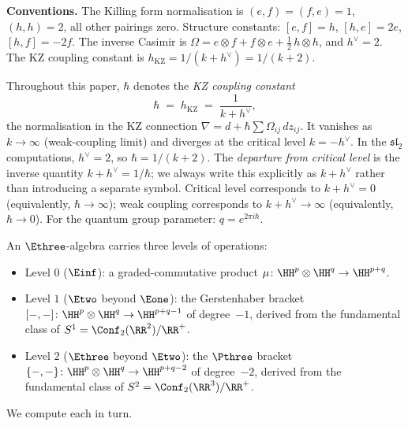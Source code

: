 \medskip
\noindent
\textbf{Conventions.}
The Killing form normalisation is
$(e, f) = (f, e) = 1$, $(h, h) = 2$, all other pairings zero.
Structure constants: $[e, f] = h$, $[h, e] = 2e$,
$[h, f] = -2f$. The inverse Casimir is
$\Omega = e \otimes f + f \otimes e
+ \tfrac{1}{2}\,h \otimes h$, and $h^\vee = 2$.
The KZ coupling constant is
$h_{\mathrm{KZ}} = 1/(k + h^\vee) = 1/(k + 2)$.

\begin{remark}
\label{rem:hbar-convention}
Throughout this paper, $\hbar$ denotes the
\emph{KZ coupling constant}
\begin{equation}\label{eq:hbar-convention}
  \hbar \;=\; h_{\mathrm{KZ}}
  \;=\; \frac{1}{k + h^\vee},
\end{equation}
the normalisation in the KZ connection
$\nabla = d + \hbar \sum \Omega_{ij}\,dz_{ij}$.
It vanishes as $k \to \infty$ (weak-coupling limit) and
diverges at the critical level $k = -h^\vee$.
In the $\mathfrak{sl}_2$ computations, $h^\vee = 2$,
so $\hbar = 1/(k+2)$.
The \emph{departure from critical level} is the inverse
quantity $k + h^\vee = 1/\hbar$; we always write this
explicitly as $k + h^\vee$ rather than introducing a
separate symbol. Critical level corresponds to
$k + h^\vee = 0$ (equivalently, $\hbar \to \infty$);
weak coupling corresponds to $k + h^\vee \to \infty$
(equivalently, $\hbar \to 0$).
For the quantum group parameter: $q = e^{2\pi i \hbar}$.
\end{remark}

An $\Ethree$-algebra carries three levels of
operations:
\begin{itemize}
\item Level $0$ ($\Einf$): a graded-commutative product
  $\mu\colon \HH^p \otimes \HH^q \to \HH^{p+q}$.
\item Level $1$ ($\Etwo$ beyond $\Eone$): the
  Gerstenhaber bracket
  $[-,-]\colon \HH^p \otimes \HH^q \to \HH^{p+q-1}$
  of degree~$-1$, derived from the fundamental class of
  $S^1 = \Conf_2(\RR^2)/\RR^+$.
\item Level $2$ ($\Ethree$ beyond $\Etwo$): the $\Pthree$
  bracket
  $\{-,-\}\colon \HH^p \otimes \HH^q \to \HH^{p+q-2}$
  of degree~$-2$, derived from the fundamental class of
  $S^2 = \Conf_2(\RR^3)/\RR^+$.
\end{itemize}
We compute each in turn.


